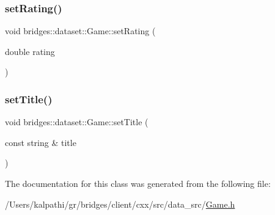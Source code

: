 \subsubsection{\texorpdfstring{set\+Rating()}{setRating()}}
{\footnotesize\ttfamily void bridges\+::dataset\+::\+Game\+::set\+Rating (\begin{DoxyParamCaption}\item[{double}]{rating }\end{DoxyParamCaption})\hspace{0.3cm}{\ttfamily [inline]}}

\mbox{\label{classbridges_1_1dataset_1_1_game_a8f8f6e03458c05e20b0b446f9ddd211a}} 
\subsubsection{\texorpdfstring{set\+Title()}{setTitle()}}
{\footnotesize\ttfamily void bridges\+::dataset\+::\+Game\+::set\+Title (\begin{DoxyParamCaption}\item[{const string \&}]{title }\end{DoxyParamCaption})\hspace{0.3cm}{\ttfamily [inline]}}



The documentation for this class was generated from the following file\+:\begin{DoxyCompactItemize}
\item 
/\+Users/kalpathi/gr/bridges/client/cxx/src/data\+\_\+src/\mbox{\hyperlink{_game_8h}{Game.\+h}}\end{DoxyCompactItemize}
